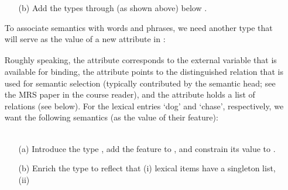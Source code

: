 \documentclass[10pt]{article}
\begin{document}
\begin{enumerate}
\begin{itemize}
          \item [(b)]
                Add the types  through
                 (as shown above) below 
                .
        \end{itemize}
  \item []
        To associate semantics with words and phrases, we need another
        type that will serve as the value of a new  attribute
        in :\\
        \verb|  |%
        \\
        Roughly speaking, the  attribute corresponds to the
        external variable that is available for binding, the 
        attribute points to the distinguished relation that is used for
        semantic selection (typically contributed by the semantic head;
        see the MRS paper in the course reader), and the 
        attribute holds a list of relations (see below).
        For the lexical entries `dog' and `chase', respectively, we want
        the following semantics (as the value of their 
        feature):\\ 
         \\
        \begin{itemize}
          \item [(a)]
                Introduce the type , add the feature
                 to , and constrain its value
                to .
          \item [(b)]
                Enrich the  type to reflect that (i)
                lexical items have a singleton  list, (ii)

\end{itemize}
\end{enumerate}
\end{document}
